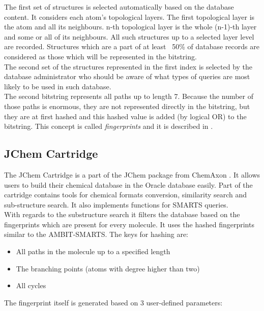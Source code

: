 The first set of structures is selected automatically based on the database content. It considers each atom’s topological layers. The first topological layer is the atom and all its neighbours. n-th topological layer is the whole (n-1)-th layer and some or all of its neighbours. All such structures up to a selected layer level are recorded. Structures which are a part of at least ~50\% of database records are considered as those which will be represented in the bitstring.\\

The second set of the structures represented in the first index is selected by the database administrator who should be aware of what types of queries are most likely to be used in such database.\\

The second bitstring represents all paths up to length 7. Because the number of those paths is enormous, they are not represented directly in the bitstring, but they are at first hashed and this hashed value is added (by logical OR) to the bitstring. This concept is called \textit{fingerprints} and it is described in \cite{fingerprints}.

\subsection{JChem Cartridge}

The JChem Cartridge is a part of the JChem package from ChemAxon \cite{Chemaxon}. It allows users to build their chemical database in the Oracle database easily. Part of the cartridge contains tools for chemical formats conversion, similarity search and sub-structure search. It also implements functions for SMARTS queries.\\

With regards to the substructure search it filters the database based on the fingerprints which are present for every molecule. It uses the hashed fingerprints similar to the AMBIT-SMARTS. The keys for hashing are:

\begin{itemize}
	\item All paths in the molecule up to a specified length
	\item The branching points (atoms with degree higher than two)
	\item All cycles
\end{itemize}

\noindent The fingerprint itself is generated based on 3 user-defined parameters:

